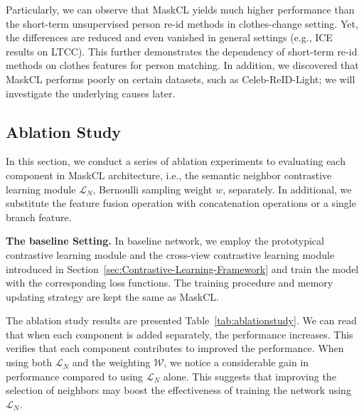 \documentclass[10pt,twocolumn,letterpaper]{article}
\newcommand{\myparagraph}[1]{\noindent\textbf{#1.}}
\def\ie{i.e.}
\def\eg{e.g.}
\begin{document}
Particularly, we can observe that MaskCL yields much higher performance than the short-term unsupervised person re-id methods in clothes-change setting. Yet, the differences are reduced and even vanished in general settings (\eg, ICE results on LTCC).  This further demonstrates the dependency of short-term re-id methods on clothes features for person matching. 
In addition, we discovered that MaskCL performs poorly on certain datasets, such as Celeb-ReID-Light; we will investigate the underlying causes later.


\subsection{Ablation Study}
In this section, we conduct a series of ablation experiments to evaluating each component in MaskCL architecture, \ie, the semantic neighbor contrastive learning module $\mathcal{L}_{N}$,  Bernoulli sampling weight $w$, separately.
In additional, we substitute the feature fusion operation with concatenation operations or a single branch feature. 



\myparagraph{The baseline Setting} In baseline network, we employ the prototypical contrastive learning module and the cross-view contrastive learning module introduced in Section~\ref{sec:Contrastive-Learning-Framework} and train the model with the corresponding loss functions. The training procedure and memory updating strategy are kept the same as MaskCL. 


The ablation study results are presented Table~\ref{tab:ablationstudy}. We can read that when each component is added separately, the performance increases. This verifies that each component contributes to improved the performance.
When using both $\mathcal{L}_{N}$ and the weighting $\mathcal{W}$, we notice a considerable gain in performance compared to using $\mathcal{L}_{N}$ alone. This suggests that improving the selection of neighbors may boost the effectiveness of training the network using $\mathcal{L}_{N}$.
\end{document}
